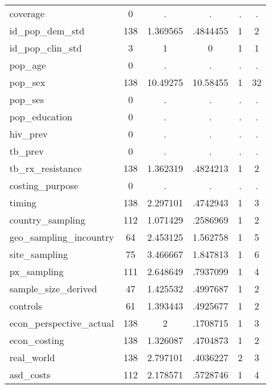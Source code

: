 \begin{table}[htbp]
\begin{tabular}{l*{1}{ccccc}}
coverage    &           0&           .&           .&           .&           .\\
id\_pop\_dem\_std&         138&    1.369565&    .4844455&           1&           2\\
id\_pop\_clin\_std&           3&           1&           0&           1&           1\\
pop\_age     &           0&           .&           .&           .&           .\\
pop\_sex     &         138&    10.49275&    10.58455&           1&          32\\
pop\_ses     &           0&           .&           .&           .&           .\\
pop\_education&           0&           .&           .&           .&           .\\
hiv\_prev    &           0&           .&           .&           .&           .\\
tb\_prev     &           0&           .&           .&           .&           .\\
tb\_rx\_resistance&         138&    1.362319&    .4824213&           1&           2\\
costing\_purpose&           0&           .&           .&           .&           .\\
timing      &         138&    2.297101&    .4742943&           1&           3\\
country\_sampling&         112&    1.071429&    .2586969&           1&           2\\
geo\_sampling\_incountry&          64&    2.453125&    1.562758&           1&           5\\
site\_sampling&          75&    3.466667&    1.847813&           1&           6\\
px\_sampling &         111&    2.648649&    .7937099&           1&           4\\
sample\_size\_derived&          47&    1.425532&    .4997687&           1&           2\\
controls    &          61&    1.393443&    .4925677&           1&           2\\
econ\_perspective\_actual&         138&           2&    .1708715&           1&           3\\
econ\_costing&         138&    1.326087&    .4704873&           1&           2\\
real\_world  &         138&    2.797101&    .4036227&           2&           3\\
asd\_costs   &         112&    2.178571&    .5728746&           1&           4\\

\end{tabular}
\end{table}
